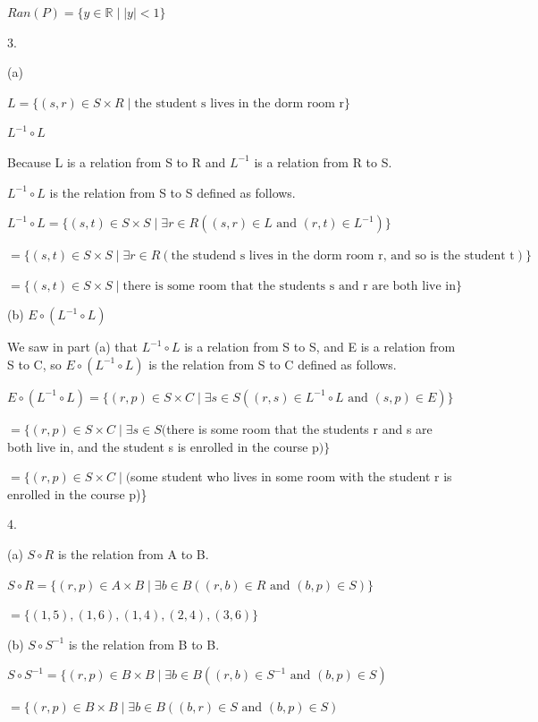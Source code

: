 \documentclass{article}
\newcommand{\vs}{\vspace{30pt}}
\begin{document}
$Ran(P) = \{y \in \mathbb{R} \mid |y| < 1\}$
\vs

3.

(a)

$L = \{(s, r) \in S \times R \mid \text{the student s lives in the dorm room r}\}$

$L^{-1} \circ L$

Because L is a relation from S to R and $L^{-1}$ is a relation from R to S.

$L^{-1} \circ L$ is the relation from S to S defined as follows.

$L^{-1} \circ L = \{(s, t) \in S \times S \mid \exists r \in R ((s, r) \in L \text{ and } (r, t) \in L^{-1}) \}$

\quad $= \{(s, t) \in S \times S \mid \exists r \in R(\text{the studend s lives in the dorm room r, and so is the student t})\}$

\quad $= \{(s,t) \in S \times S \mid \text{there is some room that the students s and r are both live in}\}$

\vs
(b) $E \circ (L^{-1} \circ L)$

We saw in part (a) that $L^{-1} \circ L$ is a relation from S to S, and E is a relation from S to C, so $E \circ (L^{-1} \circ L)$ is the relation from S to C defined as follows.

$E \circ (L^{-1} \circ L) = \{(r, p) \in S \times C \mid \exists s \in S ((r,s) \in L^{-1} \circ L \text{ and } (s, p) \in E)\}$

\quad $= \{(r, p) \in S \times C \mid \exists s \in S ($there is some room that the students r and s are both live in, and the student s is enrolled in the course p$)\}$

\quad $=\{(r,p) \in S \times C \mid ($some student who lives in some room with the student r is enrolled in the course p)\}
\vs

4.

(a) $S \circ R$ is the relation from A to B.


$S \circ R = \{(r,p) \in A \times B \mid \exists b \in B ((r,b) \in R \text{ and } (b, p) \in S)\}$

\quad $=\{(1,5),(1,6),(1,4),(2,4),(3,6)\}$

(b) $S \circ S^{-1}$ is the relation from B to B.

$S \circ S^{-1} = \{(r,p) \in B \times B \mid \exists b \in B ((r,b) \in S^{-1} \text{ and } (b,p) \in S)$

\quad $=\{(r,p) \in B \times B \mid \exists b \in B ((b,r) \in S \text{ and } (b,p) \in S)$
\end{document}

